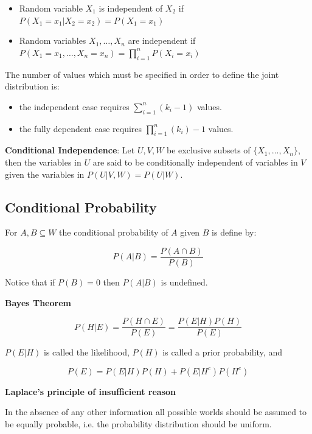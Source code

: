 \documentclass{article}
\begin{document}
\begin{itemize}
    \item Random variable $X_1$ is independent of $X_2$ if $P(X_1 =x_1 | X_2 = x_2)=P(X_1 = x_1)$
    \item Random variables $X_1, \dots, X_n$ are independent if $P(X_1=x_1, \dots, X_n=x_n) = \prod_{i=1}^{n}P(X_i=x_i)$
\end{itemize}

The number of values which must be specified in order to define the joint distribution is:

\begin{itemize}
    \item the independent case requires $\sum^n_{i=1}(k_i - 1)$ values.
    \item the fully dependent case requires $\prod^n_{i=1}(k_i)-1$ values.
\end{itemize}

\textbf{Conditional Independence}: Let $U, V, W$ be exclusive subsets of $\{X_1, ..., X_n\}$, then the variables in $U$ are said to be conditionally independent of variables in $V$ given the variables in $P(U|V, W) = P(U | W)$.


\subsection{Conditional Probability}

For $A, B \subseteq W$ the conditional probability of $A$ given $B$ is define by:

\begin{equation}
    P(A|B) = \frac{P(A \cap B)}{P(B)}
\end{equation}

Notice that if $P(B) = 0$ then $P(A|B)$ is undefined.

\textbf{Bayes Theorem}

\begin{equation}
    P(H|E) = \frac{P(H \cap E)}{P(E)} = \frac{P(E|H)P(H)}{P(E)}
\end{equation}

$P(E|H)$ is called the likelihood, $P(H)$ is called a prior probability, and

\begin{equation}
    P(E) = P(E|H)P(H) + P(E|H^c)P(H^c)
\end{equation}


\textbf{Laplace’s principle of insufficient reason}

In the absence of any other information all possible worlds should be assumed to be equally probable, i.e. the probability distribution should be uniform.
\end{document}
